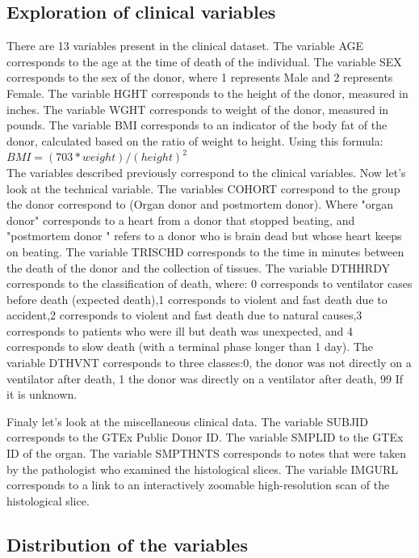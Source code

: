 \documentclass[a4paper, 11pt]{article}
\begin{document}
\begin{multicols}{2}
\section{Exploration of  clinical variables}

There are 13 variables present in the clinical dataset.
The variable AGE corresponds to the age at the time of death of the individual.
The variable SEX corresponds to the sex of the donor, where 1 represents Male and 2 represents Female.
The variable HGHT corresponds to the height of the donor, measured in inches.
The variable WGHT corresponds to weight of the donor, measured in pounds. 
The variable BMI corresponds to an indicator of the body fat of the donor, calculated based on the ratio of weight to height. Using this formula: 
\\

$ BMI = (703*weight)/(height)^2$ 
\\

The variables described previously correspond to the clinical variables. Now let's look at the technical variable. 
The variables COHORT correspond to the group the donor correspond to (Organ donor and postmortem donor). Where "organ donor" corresponds to a heart from a donor that stopped beating, and "postmortem donor " refers to a donor who is brain dead but whose heart keeps on beating.
The variable TRISCHD corresponds to the time in minutes between the death of the donor and the collection of tissues.
The variable DTHHRDY corresponds to the classification of death, where: 0 corresponds to ventilator cases before death (expected death),1 corresponds to violent and fast death due to accident,2 corresponds to violent and fast death due to natural causes,3 corresponds to patients who were ill but death was unexpected, and 4 corresponds to slow death (with a terminal phase longer than 1 day). 
The variable DTHVNT corresponds to three classes:0, the donor was not directly on a ventilator after death, 1 the donor was directly on a ventilator after death, 99 If it is unknown.

Finaly let's look at the miscellaneous clinical data. 
The variable SUBJID corresponds to the GTEx Public Donor ID. 
The variable SMPLID to the GTEx ID of the organ. 
The variable SMPTHNTS corresponds to notes that were taken by the pathologist who examined the histological slices. 
The variable IMGURL corresponds to a link to an interactively zoomable high-resolution scan of the histological slice. 
\subsection{Distribution of the variables}


\end{multicols}
\end{document}
